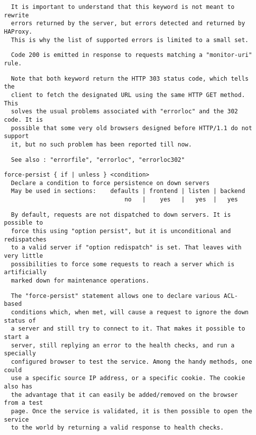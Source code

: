 \begin{verbatim}
  It is important to understand that this keyword is not meant to rewrite
  errors returned by the server, but errors detected and returned by HAProxy.
  This is why the list of supported errors is limited to a small set.
\end{verbatim}

\begin{verbatim}
  Code 200 is emitted in response to requests matching a "monitor-uri" rule.
\end{verbatim}

\begin{verbatim}
  Note that both keyword return the HTTP 303 status code, which tells the
  client to fetch the designated URL using the same HTTP GET method. This
  solves the usual problems associated with "errorloc" and the 302 code. It is
  possible that some very old browsers designed before HTTP/1.1 do not support
  it, but no such problem has been reported till now.
\end{verbatim}

\begin{verbatim}
  See also : "errorfile", "errorloc", "errorloc302"
\end{verbatim}

\begin{verbatim}
force-persist { if | unless } <condition>
  Declare a condition to force persistence on down servers
  May be used in sections:    defaults | frontend | listen | backend
                                  no   |    yes   |   yes  |   yes
\end{verbatim}

\begin{verbatim}
  By default, requests are not dispatched to down servers. It is possible to
  force this using "option persist", but it is unconditional and redispatches
  to a valid server if "option redispatch" is set. That leaves with very little
  possibilities to force some requests to reach a server which is artificially
  marked down for maintenance operations.
\end{verbatim}

\begin{verbatim}
  The "force-persist" statement allows one to declare various ACL-based
  conditions which, when met, will cause a request to ignore the down status of
  a server and still try to connect to it. That makes it possible to start a
  server, still replying an error to the health checks, and run a specially
  configured browser to test the service. Among the handy methods, one could
  use a specific source IP address, or a specific cookie. The cookie also has
  the advantage that it can easily be added/removed on the browser from a test
  page. Once the service is validated, it is then possible to open the service
  to the world by returning a valid response to health checks.
\end{verbatim}

